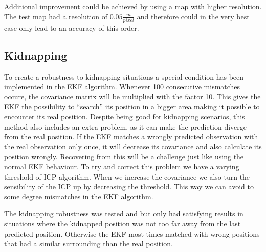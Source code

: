 Additional improvement could be achieved by using a map with higher resolution. The test map had a resolution of $0.05 \frac{m}{pixel}$ and therefore could in the very best case only lead to an accuracy of this order. 


\subsection{Kidnapping}
\label{subsec:Kidnapping}
To create a robustness to kidnapping situations a special condition has been implemented in the EKF algorithm. Whenever  100 consecutive mismatches occure, the covariance matrix will be multiplied with the factor 10. This gives the EKF the possibility to “search” its position in a bigger area making it possible to encounter its real position. Despite being good for kidnapping scenarios, this method also includes an extra problem, as it can make the prediction diverge from the real position. If the EKF matches a wrongly predicted observation with the real observation only once, it will decrease its covariance and also calculate its position wrongly. Recovering from this will be a challenge just like using the normal EKF behaviour. To try and correct this problem we have a varying threshold of ICP algorithm. When we increase the covariance we also turn the sensibility of the ICP up by decreasing the threshold. This way we can avoid to some degree mismatches in the EKF algorithm. 

The kidnapping robustness was tested and but only had satisfying results in situations where the kidnapped position was not too far away from the last predicted position. Otherwise the EKF most times matched with wrong positions that had a similar surrounding than the real position.

